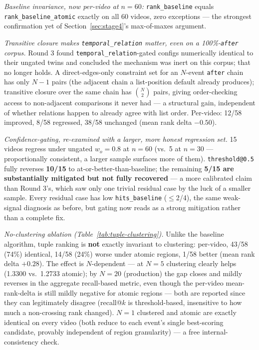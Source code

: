 \documentclass[11pt]{article}
\newcommand{\code}[1]{\texttt{\small #1}}
\begin{document}
\emph{Baseline invariance, now per-video at $n=60$:} \code{rank\_baseline} equals
\code{rank\_baseline\_atomic} exactly on all 60 videos, zero exceptions --- the strongest
confirmation yet of Section~\ref{sec:stage4}'s max-of-maxes argument.

\emph{Transitive closure makes \code{temporal\_relation} matter, even on a 100\%-\code{after}
corpus.} Round 3 found \code{temporal\_relation}-gated configs numerically identical to their
ungated twins and concluded the mechanism was inert on this corpus; that no longer holds. A
direct-edges-only constraint set for an $N$-event \code{after} chain has only $N{-}1$ pairs (the
adjacent chain a list-position default already produces); transitive closure over the same chain
has $\binom{N}{2}$ pairs, giving order-checking access to non-adjacent comparisons it never had ---
a structural gain, independent of whether relations happen to already agree with list order.
Per-video: 12/58 improved, 8/58 regressed, 38/58 unchanged (mean rank delta $-0.50$).

\emph{Confidence-gating, re-examined with a larger, more honest regression set.} 15 videos regress
under ungated $w_o{=}0.8$ at $n=60$ (vs.\ 5 at $n=30$ --- proportionally consistent, a larger sample
surfaces more of them). \code{threshold@0.5} fully reverses \textbf{10/15} to at-or-better-than-baseline;
the remaining \textbf{5/15 are substantially mitigated but not fully recovered} --- a more
calibrated claim than Round 3's, which saw only one trivial residual case by the luck of a smaller
sample. Every residual case has low \code{hits\_baseline} ($\le$2/4), the same weak-signal
diagnosis as before, but gating now reads as a strong mitigation rather than a complete fix.

\emph{No-clustering ablation (Table~\ref{tab:tuple-clustering}).} Unlike the baseline algorithm,
tuple ranking is \textbf{not} exactly invariant to clustering: per-video, 43/58 (74\%) identical,
14/58 (24\%) worse under atomic regions, 1/58 better (mean rank delta $+0.28$). The effect is
$N$-dependent --- at $N{=}5$ clustering clearly helps (1.3300 vs.\ 1.2733 atomic); by $N{=}20$
(production) the gap closes and mildly reverses in the aggregate recall-based metric, even though
the per-video mean-rank-delta is still mildly negative for atomic regions --- both are reported
since they can legitimately disagree (recall@$k$ is threshold-based, insensitive to how much a
non-crossing rank changed). $N{=}1$ clustered and atomic are exactly identical on every video (both
reduce to each event's single best-scoring candidate, provably independent of region granularity)
--- a free internal-consistency check.
\end{document}

